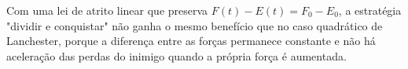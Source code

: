 Com uma lei de atrito linear que preserva $F(t)-E(t)=F_0-E_0$, a estratégia "dividir e conquistar" não ganha o mesmo benefício que no caso quadrático de Lanchester, porque a diferença entre as forças permanece constante e não há aceleração das perdas do inimigo quando a própria força é aumentada. 